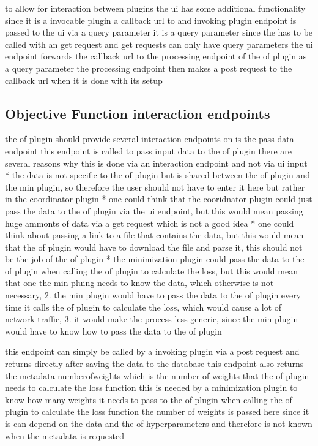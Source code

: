 \documentclass[
  a4paper,  %
  twoside,  %
  bibliography=totoc,
  headsepline,
  cleardoublepage=empty,
  parskip=half,
  draft=false
]{scrbook}
\begin{document}
to allow for interaction between plugins the ui has some additional functionality
since it is a invocable plugin a callback url to and invoking plugin endpoint is passed to the ui via a query parameter
it is a query parameter since the has to be called with an get request and get requests can only have query parameters
the ui endpoint forwards the callback url to the processing endpoint of the of plugin as a query parameter
the processing endpoint then makes a post request to the callback url when it is done with its setup

\subsection{Objective Function interaction endpoints}
\label{subsec:objectiveFunctionInteractionEndpoints}
the of plugin should provide several interaction endpoints
on is the pass data endpoint
this endpoint is called to pass input data to the of plugin
there are several reasons why this is done via an interaction endpoint and not via ui input
* the data is not specific to the of plugin but is shared between the of plugin and the min plugin, so therefore the user should not have to enter it here but rather in the coordinator plugin
* one could think that the cooridnator plugin could just pass the data to the of plugin via the ui endpoint, but this would mean passing huge ammonts of data via a get request which is not a good idea
* one could think about passing a link to a file that contains the data, but this would mean that the of plugin would have to download the file and parse it, this should not be the job of the of plugin
* the minimization plugin could pass the data to the of plugin when calling the of plugin to calculate the loss, but this would mean that one the min pluing needs to know the data, which otherwise is not necessary, 2. the min plugin would have to pass the data to the of plugin every time it calls the of plugin to calculate the loss, which would cause a lot of network traffic, 3. it would make the process less generic, since the min plugin would have to know how to pass the data to the of plugin

this endpoint can simply be called by a invoking plugin via a post request and returns directly after saving the data to the database
this endpoint also returns the metadata numberofweights which is the number of weights that the of plugin needs to calculate the loss function
this is needed by a minimization plugin to know how many weights it needs to pass to the of plugin when calling the of plugin to calculate the loss function
the number of weights is passed here since it is can depend on the data and the of hyperparameters and therefore is not known when the metadata is requested
\end{document}
